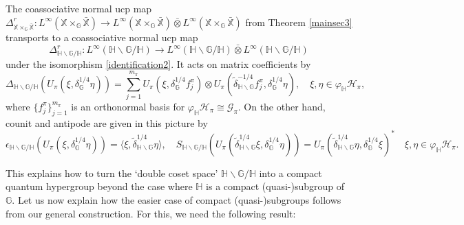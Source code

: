\documentclass[reqno]{amsart}
\numberwithin{equation}{section}
\newcommand\XGX{\X\times_\G \bar{\X}}
\renewcommand{\H}{\mathbb{H}}
\newcommand{\mcG}{\mathcal{G}}
\newcommand{\mcH}{\mathcal{H}}
\newcommand{\G}{\mathbb{G}}
\newcommand{\X}{\mathbb{X}}
\newcommand{\ovot}{\bar{\otimes}}
\begin{document}
The coassociative normal ucp map $\Delta_{\XGX}^r: L^\infty(\XGX)\to L^\infty(\XGX)\ovot L^\infty(\XGX)$ from Theorem \ref{mainsec3} transports to a coassociative normal ucp map
$$\Delta_{\H\backslash \G/\H}^r: L^\infty(\H \backslash \G/\H)\to L^\infty(\H \backslash \G/\H)\ovot L^\infty(\H \backslash \G/\H)$$
under the isomorphism \eqref{identification2}. It acts on matrix coefficients by
\begin{equation}\label{compl}
    \Delta_{\H\backslash \G/\H}(U_\pi(\xi, \delta_\G^{1/4}\eta)) = \sum_{j=1}^{m_\pi} U_\pi(\xi, \delta_\G^{1/4} f_j^\pi)\otimes U_\pi(\tilde{\delta}_{\H\backslash \G}^{-1/4} f_j^\pi, \delta_\G^{1/4}\eta), \quad \xi, \eta \in \varphi_\H \mcH_\pi,
\end{equation} 
where $\{f_j^\pi\}_{j=1}^{m_\pi}$ is an orthonormal basis for $\varphi_\H \mcH_\pi\cong \mcG_\pi$. 
On the other hand, counit and antipode are given in this picture by
$$\epsilon_{\mathbb{H}\backslash \G/\H}(U_\pi(\xi, \delta_\G^{1/4}\eta))  = \langle \xi, \tilde{\delta}_{\H\backslash \G}^{1/4}\eta\rangle, \quad S_{\H\backslash \G/\H}(U_\pi(\tilde{\delta}_{\H\backslash \G}^{1/4}\xi, \delta_\G^{1/4}\eta)) = U_\pi(\tilde{\delta}_{\H\backslash \G}^{1/4}\eta, \delta_\G^{1/4}\xi)^* \quad \xi, \eta \in \varphi_\H \mcH_\pi.$$

This explains how to turn the `double coset space' $\H\backslash\G/\H$ into a  compact quantum hypergroup beyond the case where $\H$ is a compact (quasi-)subgroup of $\G$. Let us now explain how the easier case of compact (quasi-)subgroups follows from our general construction. For this, we need the following result:
\end{document}
